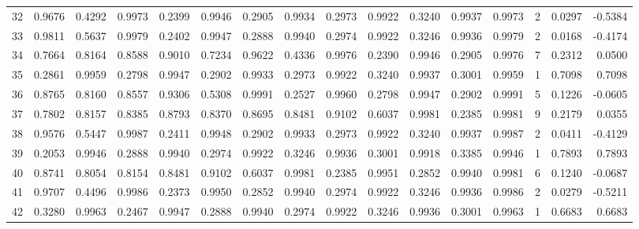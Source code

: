\begin{tabular}{lrrrrrrrrrrrrrrr}
32  &      0.9676 &  0.4292 &  0.9973 &  0.2399 &  0.9946 &  0.2905 &  0.9934 &  0.2973 &  0.9922 &  0.3240 &   0.9937 &     0.9973 &      2 &                    0.0297 &                    -0.5384 \\
33  &      0.9811 &  0.5637 &  0.9979 &  0.2402 &  0.9947 &  0.2888 &  0.9940 &  0.2974 &  0.9922 &  0.3246 &   0.9936 &     0.9979 &      2 &                    0.0168 &                    -0.4174 \\
34  &      0.7664 &  0.8164 &  0.8588 &  0.9010 &  0.7234 &  0.9622 &  0.4336 &  0.9976 &  0.2390 &  0.9946 &   0.2905 &     0.9976 &      7 &                    0.2312 &                     0.0500 \\
35  &      0.2861 &  0.9959 &  0.2798 &  0.9947 &  0.2902 &  0.9933 &  0.2973 &  0.9922 &  0.3240 &  0.9937 &   0.3001 &     0.9959 &      1 &                    0.7098 &                     0.7098 \\
36  &      0.8765 &  0.8160 &  0.8557 &  0.9306 &  0.5308 &  0.9991 &  0.2527 &  0.9960 &  0.2798 &  0.9947 &   0.2902 &     0.9991 &      5 &                    0.1226 &                    -0.0605 \\
37  &      0.7802 &  0.8157 &  0.8385 &  0.8793 &  0.8370 &  0.8695 &  0.8481 &  0.9102 &  0.6037 &  0.9981 &   0.2385 &     0.9981 &      9 &                    0.2179 &                     0.0355 \\
38  &      0.9576 &  0.5447 &  0.9987 &  0.2411 &  0.9948 &  0.2902 &  0.9933 &  0.2973 &  0.9922 &  0.3240 &   0.9937 &     0.9987 &      2 &                    0.0411 &                    -0.4129 \\
39  &      0.2053 &  0.9946 &  0.2888 &  0.9940 &  0.2974 &  0.9922 &  0.3246 &  0.9936 &  0.3001 &  0.9918 &   0.3385 &     0.9946 &      1 &                    0.7893 &                     0.7893 \\
40  &      0.8741 &  0.8054 &  0.8154 &  0.8481 &  0.9102 &  0.6037 &  0.9981 &  0.2385 &  0.9951 &  0.2852 &   0.9940 &     0.9981 &      6 &                    0.1240 &                    -0.0687 \\
41  &      0.9707 &  0.4496 &  0.9986 &  0.2373 &  0.9950 &  0.2852 &  0.9940 &  0.2974 &  0.9922 &  0.3246 &   0.9936 &     0.9986 &      2 &                    0.0279 &                    -0.5211 \\
42  &      0.3280 &  0.9963 &  0.2467 &  0.9947 &  0.2888 &  0.9940 &  0.2974 &  0.9922 &  0.3246 &  0.9936 &   0.3001 &     0.9963 &      1 &                    0.6683 &                     0.6683 \\

\end{tabular}
